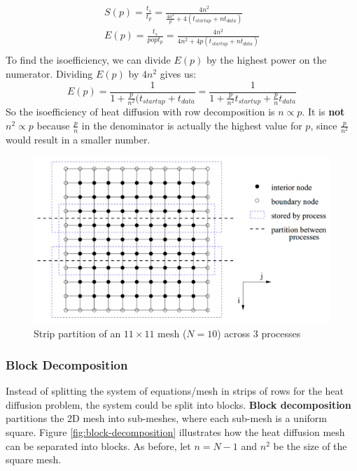 \documentclass{article}
\begin{document}
\begin{multline} \\
	S(p) = \frac{t_s}{t_p} = \frac{4n^2}{\frac{4n^2}{p} + 4(t_{startup} + nt_{data})} \\
	E(p) = \frac{t_s}{popt_p} = \frac{4n^2}{4n^2 + 4p(t_{startup} + nt_{data})}
	\\
	\label {eq:row-decomp-heat-speedup-efficiency}
\end{multline}
To find the isoefficiency, we can divide $E(p)$ by the highest power on the numerator. Dividing $E(p)$ by $4n^2$ gives us:
\begin{equation}
	E(p) = \frac{1}{1 + \frac{p}{n^2}(t_{startup} + t_{data}} = \frac{1}{1 + \frac{p}{n^2}t_{startup} + \frac{p}{n}t_{data}}
	\label {eq:row-decomp-heat-isoefficiency}	
\end{equation}
So the isoefficiency of heat diffusion with row decomposition is $n \propto p$. It is \textbf{not} $n^2 \propto p$ because $\frac{p}{n}$ in the denominator is actually the highest value for $p$, since $\frac{p}{n^2}$ would result in a smaller number.

\begin{figure}
	\centering
	\includegraphics[scale=0.4]{figures/strip-decomposition.png}
	\caption{Strip partition of an $11 \times 11$ mesh ($N = 10$) across 3 processes}
	\label{fig:strip-decomposition}
\end{figure}

\subsubsection{Block Decomposition}

Instead of splitting the system of equations/mesh in strips of rows for the heat diffusion problem, the system could be split into blocks. \textbf{Block decomposition} partitions the 2D mesh into sub-meshes, where each sub-mesh is a uniform square. Figure \ref{fig:block-decomposition} illustrates how the heat diffusion mesh can be separated into blocks. As before, let $n = N - 1$ and $n^2$ be the size of the square mesh.
\end{document}
